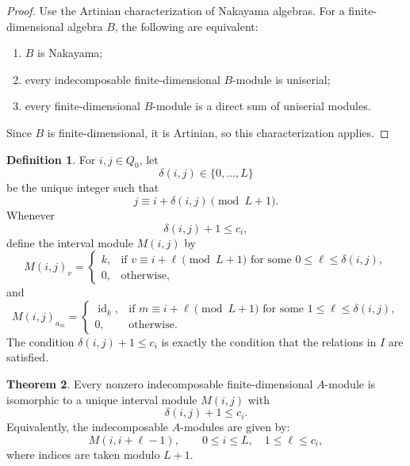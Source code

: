 \documentclass[11pt]{article}
\theoremstyle{definition}
\newtheorem{theorem}{Theorem}[section]
\newtheorem{definition}[theorem]{Definition}
\begin{document}
\begin{proof}
Use the Artinian characterization of Nakayama algebras. For a
finite-dimensional algebra \(B\), the following are equivalent:
\begin{enumerate}
  \item \(B\) is Nakayama;
  \item every indecomposable finite-dimensional \(B\)-module is
  uniserial;
  \item every finite-dimensional \(B\)-module is a direct sum of
  uniserial modules.
\end{enumerate}
Since \(B\) is finite-dimensional, it is Artinian, so this
characterization applies.
\end{proof}
\begin{definition}
For \(i,j\in Q_0\), let
\[
\delta(i,j)\in \{0,\ldots,L\}
\]
be the unique integer such that
\[
j\equiv i+\delta(i,j)\pmod {L+1}.
\]
Whenever
\[
\delta(i,j)+1\leq c_i,
\]
define the interval module \(M(i,j)\) by
\[
M(i,j)_v=
\begin{cases}
k, & \text{if } v\equiv i+\ell \pmod {L+1}
      \text{ for some }0\leq \ell\leq \delta(i,j),\\
0, & \text{otherwise,}
\end{cases}
\]
and
\[
M(i,j)_{a_m}=
\begin{cases}
\operatorname{id}_k,
& \text{if } m\equiv i+\ell \pmod {L+1}
  \text{ for some }1\leq \ell\leq \delta(i,j),\\
0, & \text{otherwise.}
\end{cases}
\]
The condition \(\delta(i,j)+1\leq c_i\) is exactly the condition that the
relations in \(I\) are satisfied.
\end{definition}
\begin{theorem}
Every nonzero indecomposable finite-dimensional \(A\)-module is
isomorphic to a unique interval module \(M(i,j)\) with
\[
\delta(i,j)+1\leq c_i.
\]
Equivalently, the indecomposable \(A\)-modules are given by:
\[
M(i,i+\ell-1),
\qquad
0\leq i\leq L,\quad 1\leq \ell\leq c_i,
\]
where indices are taken modulo \(L+1\).
\end{theorem}
\end{document}
